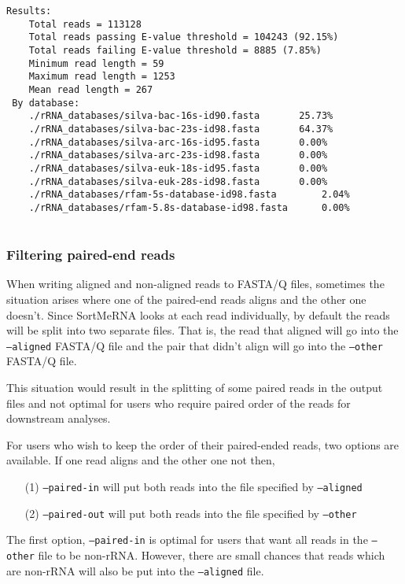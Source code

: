 \documentclass[10pt,a4paper]{article}
\begin{document}
\begin{Verbatim}[fontsize=\footnotesize]
 Results:
    Total reads = 113128
    Total reads passing E-value threshold = 104243 (92.15%)
    Total reads failing E-value threshold = 8885 (7.85%)
    Minimum read length = 59
    Maximum read length = 1253
    Mean read length = 267
 By database:
    ./rRNA_databases/silva-bac-16s-id90.fasta		25.73%
    ./rRNA_databases/silva-bac-23s-id98.fasta		64.37%
    ./rRNA_databases/silva-arc-16s-id95.fasta		0.00%
    ./rRNA_databases/silva-arc-23s-id98.fasta		0.00%
    ./rRNA_databases/silva-euk-18s-id95.fasta		0.00%
    ./rRNA_databases/silva-euk-28s-id98.fasta		0.00%
    ./rRNA_databases/rfam-5s-database-id98.fasta		2.04%
    ./rRNA_databases/rfam-5.8s-database-id98.fasta		0.00%
    
 \end{Verbatim}

\subsubsection{Filtering paired-end reads}

When writing aligned and non-aligned reads to FASTA/Q files, sometimes the situation arises 
where one of the paired-end reads aligns and the other one doesn't. Since SortMeRNA
looks at each read individually, by default the reads will be split into two separate files. That is, the read that
aligned will go into the {\tt--aligned} FASTA/Q file and the pair that didn't align will go into the
{\tt--other} FASTA/Q file.

This situation would result in the splitting of some paired reads in the
output files and not optimal for users who require paired order of the reads for
downstream analyses.

For users who  wish to keep the order of their paired-ended reads, two options are available.
If one read aligns and the other one not then,

\begin{enumerate}
 \item[(1)] {\tt--paired-in} will put both reads into the file specified by {\tt--aligned}
 \item[(2)] {\tt--paired-out} will put both reads into the file specified by {\tt--other}
\end{enumerate}

The first option, {\tt--paired-in} is optimal for users that want all reads in the {\tt--other} file
to be non-rRNA. However, there are small chances that reads which are non-rRNA will also be
put into the {\tt--aligned} file.
\end{document}
